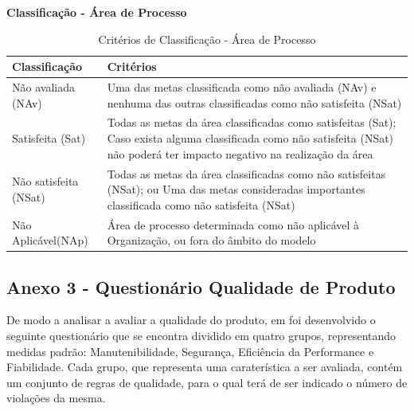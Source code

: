 \documentclass[openany,10pt,a4paper]{article}
\begin{document}
\begin{appendix}
\begin{table}[H]
	\textbf{Classificação - Área de Processo}
		\centering
		\caption{Critérios de Classificação - Área de Processo}
		\begin{tabular}{|p{1in}p{5in}|}		
			\hline
			\textbf{Classificação}  & \textbf{Critérios}\\ 
			\hline
			Não avaliada (NAv) & Uma das metas classificada como não avaliada (NAv) e nenhuma das
			outras classificadas como não satisfeita (NSat) \\
			\hline
			Satisfeita (Sat) & Todas as metas da área classificadas como satisfeitas (Sat);
			Caso exista alguma classificada como não satisfeita (NSat) não poderá
			ter impacto negativo na realização da área \\
			\hline
			Não satisfeita (NSat) & Todas as metas da área classificadas como não satisfeitas (NSat); ou
			Uma das metas consideradas importantes classificada como não
			satisfeita (NSat) \\
			\hline
			Não Aplicável(NAp) & Área de processo determinada como não aplicável à Organização, ou
			fora do âmbito do modelo \\
			\hline
		\end{tabular} 
\end{table}

\subsection{Anexo 3 - Questionário Qualidade de Produto}
\label{anexo_produto}
De modo a analisar a avaliar a qualidade do produto, em foi desenvolvido o seguinte questionário que se encontra dividido em quatro grupos, representando medidas padrão: Manutenibilidade, Segurança, Eficiência da Performance e Fiabilidade.
Cada grupo, que representa uma caraterística a ser avaliada, contém um conjunto de regras de qualidade, para o qual terá de ser indicado o número de violações da mesma.


\end{appendix}
\end{document}
